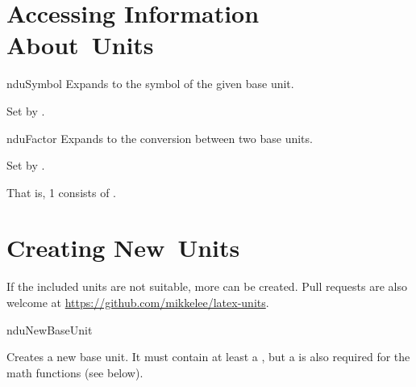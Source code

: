 \documentclass[
	a4paper,
	margin=4cm
]{article}
\begin{document}
\clearpage
\section{Accessing Information About Units} %

\begin{docCommand}
	{nduSymbol}
	{}
	Expands to the symbol of the given base unit.
	
	Set by .
\end{docCommand}

\begin{docCommand}
	{nduFactor}
	{}
	Expands to the conversion between two base units.

	Set by .
\begin{dispExample}
That is, 1  consists of
 .
\end{dispExample}
\end{docCommand}

\clearpage
\section{Creating New Units} %

\label{units:new}
If the included units are not suitable, more can be created. Pull requests are also welcome at \url{https://github.com/mikkelee/latex-units}.

\begin{docCommand}
	{nduNewBaseUnit}
	{}
	
Creates a new base unit. It must contain at least a , but a  is also required for the math functions (see below).

\end{docCommand}
\end{document}
